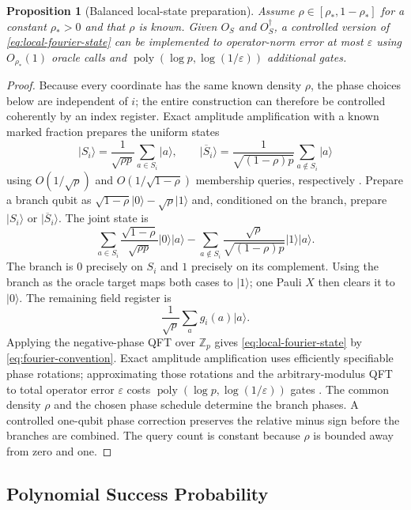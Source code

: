 \documentclass[10pt,a4paper]{amsart}
\newtheorem{proposition}[theorem]{Proposition}
\newcommand{\poly}{\operatorname{poly}}
\newcommand{\ket}[1]{\lvert #1\rangle}
\begin{document}
\begin{proposition}[Balanced local-state preparation]
\label{prop:membership-to-fourier}
Assume $\rho\in[\rho_*,1-\rho_*]$ for a constant $\rho_*>0$ and that $\rho$ is known.  Given $O_S$ and $O_S^\dagger$, a controlled version of \cref{eq:local-fourier-state} can be implemented to operator-norm error at most $\varepsilon$ using $O_{\rho_*}(1)$ oracle calls and $\poly(\log p,\log(1/\varepsilon))$ additional gates.
\end{proposition}

\begin{proof}
Because every coordinate has the same known density $\rho$, the phase choices below are independent of $i$; the entire construction can therefore be controlled coherently by an index register.  Exact amplitude amplification with a known marked fraction prepares the uniform states
\[
   \ket{S_i}=\frac1{\sqrt{\rho p}}\sum_{a\in S_i}\ket{a},
   \qquad
   \ket{\overline S_i}=\frac1{\sqrt{(1-\rho)p}}\sum_{a\notin S_i}\ket{a}
\]
using $O(1/\sqrt\rho)$ and $O(1/\sqrt{1-\rho})$ membership queries, respectively \cite{BrassardEtAl2002}.  Prepare a branch qubit as
$\sqrt{1-\rho}\ket0-\sqrt\rho\ket1$ and, conditioned on the branch, prepare $\ket{S_i}$ or $\ket{\overline S_i}$.  The joint state is
\[
   \sum_{a\in S_i}\frac{\sqrt{1-\rho}}{\sqrt{\rho p}}\ket0\ket a
   -\sum_{a\notin S_i}\frac{\sqrt\rho}{\sqrt{(1-\rho)p}}\ket1\ket a.
\]
The branch is $0$ precisely on $S_i$ and $1$ precisely on its complement.  Using the branch as the oracle target maps both cases to $\ket1$; one Pauli $X$ then clears it to $\ket0$.  The remaining field register is
\[
   \frac1{\sqrt p}\sum_a g_i(a)\ket a.
\]
Applying the negative-phase QFT over $\mathbb Z_p$ gives \cref{eq:local-fourier-state} by \cref{eq:fourier-convention}.  Exact amplitude amplification uses efficiently specifiable phase rotations; approximating those rotations and the arbitrary-modulus QFT to total operator error $\varepsilon$ costs $\poly(\log p,\log(1/\varepsilon))$ gates \cite{HalesHallgren2000}.  The common density $\rho$ and the chosen phase schedule determine the branch phases.  A controlled one-qubit phase correction preserves the relative minus sign before the branches are combined.  The query count is constant because $\rho$ is bounded away from zero and one.
\end{proof}

\subsection{Polynomial Success Probability}
\end{document}
